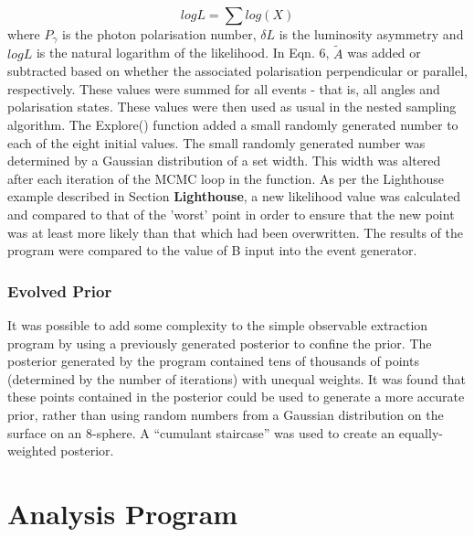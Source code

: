 \documentclass[a4paper,12pt]{article}
\begin{document}
\begin{equation}
logL = \sum log(X)
\end{equation}
where $P_{\gamma}$ is the photon polarisation number, $\delta L$ is the luminosity asymmetry and $logL$ is the natural logarithm of the likelihood.  In Eqn. 6, %
$\tilde{A}$ was added or subtracted based on whether the associated polarisation perpendicular or parallel, respectively.  These values were summed for all events - that is, all angles and polarisation states.  
\newline
These values were then used as usual in the nested sampling algorithm.  The Explore() function added a small randomly generated number to each of the eight initial values.  The small randomly generated number was determined by a Gaussian distribution of a set width.  This width was altered after each iteration of the MCMC loop in the function.  As per the Lighthouse example described in Section \textbf{Lighthouse}, a new likelihood value was calculated and compared to that of the 'worst' point in order to ensure that the new point was at least more likely than that which had been overwritten.  The results of the program were compared to the value of B input into the event generator.


\subsubsection{Evolved Prior}
It was possible to add some complexity to the simple observable extraction program by using a previously generated posterior to confine the prior.  The posterior generated by the program contained tens of thousands of points (determined by the number of iterations) with unequal weights.  It was found that these points contained in the posterior could be used to generate a more accurate prior, rather than using random numbers from a Gaussian distribution on the surface on an 8-sphere.  A ``cumulant staircase'' was used to create an equally-weighted posterior\cite{sivia}.


\section{Analysis Program}
\end{document}

